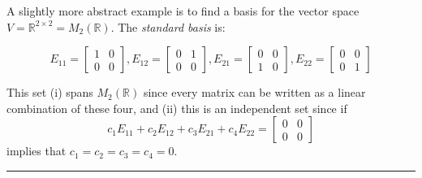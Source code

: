\begin{example}
	A slightly more abstract example is to find a basis for the vector space $V = \mathbb{R}^{2 \times 2}=M_2(\mathbb{R})$.  The  \textit{standard basis}  is:
	
	\[
	E_{11} = \begin{bmatrix} 1 & 0\\ 0 & 0 \end{bmatrix}, E_{12} = \begin{bmatrix} 0 & 1\\ 0 & 0 \end{bmatrix}, E_{21} = \begin{bmatrix} 0 & 0\\ 1 & 0 \end{bmatrix}, E_{22} = \begin{bmatrix} 0 & 0\\ 0 & 1 \end{bmatrix}
	\]
	
This set (i) spans $M_2(\mathbb{R})$ since every matrix can be written as a linear combination of these four, and (ii) this is an independent set since if
\[ c_1 E_{11} +  c_2 E_{12} +  c_3 E_{21} +  c_4 E_{22}  = 	\begin{bmatrix} 0 & 0\\ 0 & 0 \end{bmatrix} \]
implies that $c_1 = c_2 = c_3 = c_4 = 0$.  
	
\end{example}


 
\rule[0.01in]{\textwidth}{0.0025in}


















